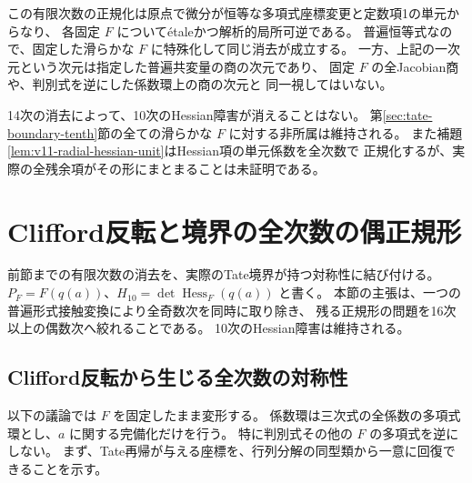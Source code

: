 この有限次数の正規化は原点で微分が恒等な多項式座標変更と定数項1の単元からなり、
各固定 $F$ についてétaleかつ解析的局所可逆である。
普遍恒等式なので、固定した滑らかな $F$ に特殊化して同じ消去が成立する。
一方、上記の一次元という次元は指定した普遍共変量の商の次元であり、
固定 $F$ の全Jacobian商や、判別式を逆にした係数環上の商の次元と
同一視してはいない。

14次の消去によって、10次のHessian障害が消えることはない。
第\ref{sec:tate-boundary-tenth}節の全ての滑らかな $F$ に対する非所属は維持される。
また補題\ref{lem:v11-radial-hessian-unit}はHessian項の単元係数を全次数で
正規化するが、実際の全残余項がその形にまとまることは未証明である。

\clearpage
\section{Clifford反転と境界の全次数の偶正規形}
\label{sec:all-order-parity}

前節までの有限次数の消去を、実際のTate境界が持つ対称性に結び付ける。
$P_F=F(q(a))$、$H_{10}=\det\operatorname{Hess}_F(q(a))$ と書く。
本節の主張は、一つの普遍形式接触変換により全奇数次を同時に取り除き、
残る正規形の問題を16次以上の偶数次へ絞れることである。
10次のHessian障害は維持される。

\subsection{Clifford反転から生じる全次数の対称性}
\label{subsec:v12-parity}

以下の議論では $F$ を固定したまま変形する。
係数環は三次式の全係数の多項式環とし、$a$ に関する完備化だけを行う。
特に判別式その他の $F$ の多項式を逆にしない。
まず、Tate再帰が与える座標を、行列分解の同型類から一意に回復できることを示す。

